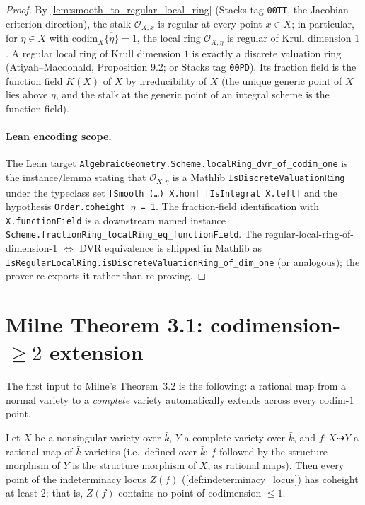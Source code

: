 \begin{proof}

  By \cref{lem:smooth_to_regular_local_ring} (Stacks tag \texttt{00TT}, the
  Jacobian-criterion direction), the stalk \(\mathcal O_{X, x}\) is regular at
  every point \(x \in X\); in particular, for \(\eta \in X\) with
  \(\mathrm{codim}_X \overline{\{\eta\}} = 1\), the local ring
  \(\mathcal O_{X, \eta}\) is regular of Krull dimension \(1\). A regular local ring of Krull dimension \(1\) is exactly a
  discrete valuation ring (Atiyah--Macdonald, Proposition 9.2; or Stacks tag
  \texttt{00PD}). Its fraction field is the function field \(K(X)\) of \(X\) by
  irreducibility of \(X\) (the unique generic point of \(X\) lies above \(\eta\), and the
  stalk at the generic point of an integral scheme is the function field).

  \paragraph{Lean encoding scope.} The Lean target
  \texttt{AlgebraicGeometry.Scheme.localRing\_dvr\_of\_codim\_one} is the
  instance/lemma stating that \(\mathcal O_{X, \eta}\) is a Mathlib
  \texttt{IsDiscreteValuationRing} under the typeclass set
  \texttt{[Smooth\,(\dots)\,X.hom]\ [IsIntegral X.left]} and the hypothesis
  \texttt{Order.coheight\ \(\eta\) = 1}. The fraction-field identification with
  \texttt{X.functionField} is a downstream named instance
  \texttt{Scheme.fractionRing\_localRing\_eq\_functionField}. The regular-local-ring-of-dimension-1
  \(\Leftrightarrow\) DVR equivalence is shipped in Mathlib as
  \texttt{IsRegularLocalRing.isDiscreteValuationRing\_of\_dim\_one} (or analogous);
  the prover re-exports it rather than re-proving.
\end{proof}

\section{Milne Theorem 3.1: codimension-\(\geq 2\) extension}
\label{sec:milne_thm31}

The first input to Milne's Theorem~3.2 is the following: a rational map from a normal
variety to a \emph{complete} variety automatically extends across every codim-\(1\)
point.

\begin{lemma}
  \label{thm:indeterminacy_codimGe2}
  Let \(X\) be a nonsingular variety over \(\bar k\), \(Y\) a complete variety
  over \(\bar k\), and \(f \colon X \dashrightarrow Y\) a rational map of
  \(\bar k\)-varieties (i.e.\ defined over \(\bar k\): \(f\) followed by the
  structure morphism of \(Y\) is the structure morphism of \(X\), as rational
  maps). Then every point of the indeterminacy locus \(Z(f)\)
  (\cref{def:indeterminacy_locus}) has coheight at least \(2\); that is,
  \(Z(f)\) contains no point of codimension \(\le 1\).
\end{lemma}

